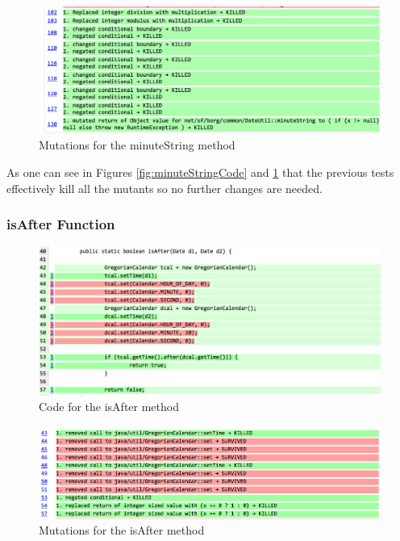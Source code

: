 \documentclass[fontsize=12pt,paper=letter,twoside]{scrartcl}
\begin{document}
\begin{figure}[!htb]
\begin{center}
\includegraphics[width=.99\textwidth]{images/MutationTesting/minuteStringMutant.png}
\end{center}
\caption{Mutations for the minuteString method}
\label{fig:minuteStringMutant}
\end{figure}

\clearpage
As one can see in Figures \ref{fig:minuteStringCode} and \ref{fig:minuteStringMutant} that the previous tests effectively kill all the mutants so no further changes are needed.


\subsubsection{isAfter Function}
\begin{figure}[!htb]
\begin{center}
\includegraphics[width=.99\textwidth]{images/MutationTesting/isAfterCode.png}
\end{center}
\caption{Code for the isAfter method}
\label{fig:isAfterCode}
\end{figure}

\begin{figure}[!htb]
\begin{center}
\includegraphics[width=.99\textwidth]{images/MutationTesting/isAfterMutant.png}
\end{center}
\caption{Mutations for the isAfter method}
\label{fig:isAfterMutant}
\end{figure}
\end{document}
